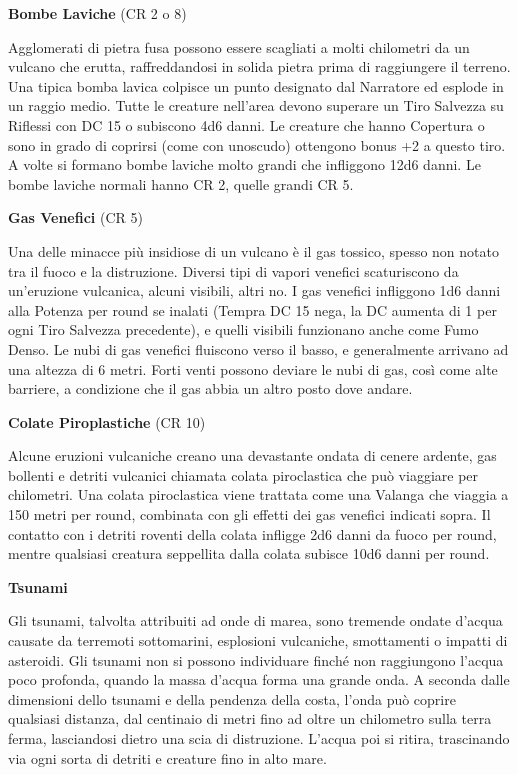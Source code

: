 \documentclass[a4paper,11pt,twoside,openany]{book}
\begin{document}
\textbf{Bombe Laviche} (CR 2 o 8)

Agglomerati di pietra fusa possono essere scagliati a molti chilometri da un vulcano che erutta, raffreddandosi in solida pietra prima di raggiungere il terreno. Una tipica bomba lavica colpisce un punto designato dal Narratore ed esplode in un raggio medio. Tutte le creature nell'area devono superare un Tiro Salvezza su Riflessi con DC 15 o subiscono 4d6 danni. Le creature che hanno Copertura o sono in grado di coprirsi (come con uno­scudo) ottengono bonus +2 a questo tiro. A volte si formano bombe laviche molto grandi che infliggono 12d6 danni. Le bombe laviche normali hanno CR 2, quelle grandi CR 5.

\textbf{Gas Venefici} (CR 5)

Una delle minacce più insidiose di un vulcano è il gas tossico, spesso non notato tra il fuoco e la distruzione. Diversi tipi di vapori venefici scaturiscono da un'eruzione vulcanica, alcuni visibili, altri no. I gas venefici infliggono 1d6 danni alla Potenza per round se inalati (Tempra DC 15 nega, la DC aumenta di 1 per ogni Tiro Salvezza precedente), e quelli visibili funzionano anche come Fumo Denso. Le nubi di gas venefici fluiscono verso il basso, e generalmente arrivano ad una altezza di 6 metri. Forti venti possono deviare le nubi di gas, così come alte barriere, a condizione che il gas abbia un altro posto dove andare.

\textbf{Colate Piroplastiche} (CR 10)

Alcune eruzioni vulcaniche creano una devastante ondata di cenere ardente, gas bollenti e detriti vulcanici chiamata colata piroclastica che può viaggiare per chilometri. Una colata piroclastica viene trattata come una Valanga che viaggia a 150 metri per round, combinata con gli effetti dei gas venefici indicati sopra. Il contatto con i detriti roventi della colata infligge 2d6 danni da fuoco per round, mentre qualsiasi creatura seppellita dalla colata subisce 10d6 danni per round.

\textbf{Tsunami}

Gli tsunami, talvolta attribuiti ad onde di marea, sono tremende ondate d'acqua causate da terremoti sottomarini, esplosioni vulcaniche, smottamenti o impatti di asteroidi. Gli tsunami non si possono individuare finché non raggiungono l'acqua poco profonda, quando la massa d'acqua forma una grande onda. A seconda dalle dimensioni dello tsunami e del­la pendenza della costa, l'onda può coprire qualsiasi distanza, dal centinaio di metri fino ad oltre un chilometro sulla terra ferma, lasciandosi dietro una scia di distruzione. L'acqua poi si ritira, trascinando via ogni sorta di detriti e creature fino in alto mare.
\end{document}
